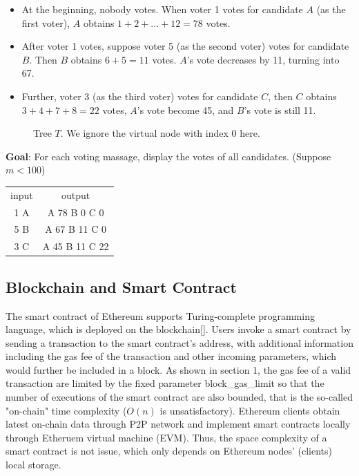 \begin{itemize}
\item At the beginning, nobody
votes. When voter 1 votes for candidate $A$ (as the first voter), $A$ obtains
$1+2+...+12=78$ votes.

\item After voter 1 votes, suppose voter 5 (as the second
voter) votes for candidate $B$. Then $B$ obtains $6+5=11$ votes. $A$'s vote
decreases by 11, turning into 67.

\item Further, voter 3 (as the third voter) votes for candidate $C$, then $C$
obtains $3+4+7+8=22$ votes, $A$'s vote become 45, and $B$'s vote is still 11.
\end{itemize}

\begin{figure}
  \centering
	\label{fig:1}
  
	\caption{Tree $T$. We ignore the virtual node with index 0 here.}
\end{figure}
\textbf{Goal}:
For each voting massage, display the votes of all candidates. (Suppose $m<100$)

\begin{tabular}{|c|c|}
input & output \\
1 A			&		A 78 B 0 C 0
\\
5 B			&		A 67 B 11 C 0
\\
3 C			&		A 45 B 11 C 22
\end{tabular}
\subsection{Blockchain and Smart Contract}
The smart contract of Ethereum supports Turing-complete programming language, which is deployed on the blockchain[]. Users invoke a smart contract by sending a transaction to the smart contract's address, with additional information including the gas fee of the transaction and other incoming parameters, which would further be included in a block. As shown in section 1, the gas fee of a valid transaction are limited by the fixed parameter block\_gas\_limit so that the number of executions of the smart contract are also bounded, that is the so-called "on-chain" time complexity ($O(n)$ is unsatisfactory).  Ethereum clients obtain latest on-chain data through P2P network and implement smart contracts locally through Etheruem virtual machine (EVM). Thus, the space complexity of a smart contract is not issue, which only depends on Ethereum nodes' (clients) local storage. 


